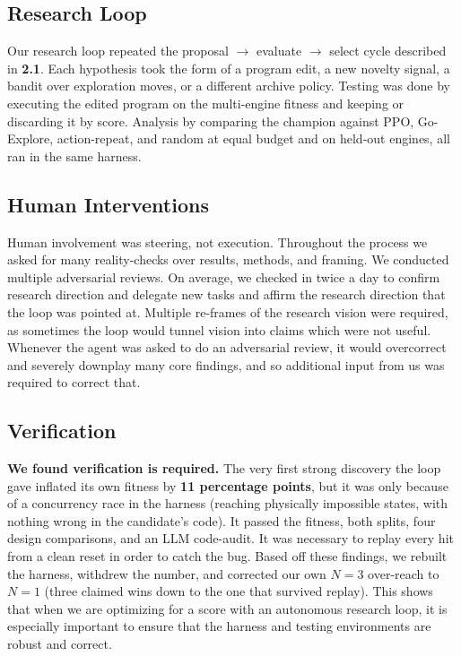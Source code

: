 \documentclass{article}
\begin{document}
\subsection{Research Loop}
\label{sec:loop}
Our research loop repeated the proposal $\rightarrow$ evaluate $\rightarrow$ select cycle described in \textbf{2.1}. Each hypothesis took the form of a
program edit, a new novelty signal, a bandit over exploration moves, or a different archive policy. Testing was done by executing the edited program on the multi-engine fitness and keeping or discarding it by score.
Analysis by comparing the champion against PPO, Go-Explore, action-repeat, and random at equal budget and on held-out
engines, all ran in the same harness.

\subsection{Human Interventions}
\label{sec:human}
Human involvement was steering, not execution. Throughout the process we asked for many reality-checks over results, methods, and framing. We conducted multiple adversarial reviews. On average, we checked in twice a day to confirm research direction and delegate new
tasks and affirm the research direction that the loop was pointed at. Multiple re-frames of the research vision were required, as sometimes the loop would tunnel
vision into claims which were not useful. Whenever the agent was asked to do an adversarial review, it would overcorrect
and severely downplay many core findings, and so additional input from us was required to correct that.

\subsection{Verification}
\label{sec:verify}
\textbf{We found verification is required.} The very first strong discovery the loop gave inflated its own fitness by \textbf{11 percentage points}, but it was only because of a concurrency race in the harness (reaching physically impossible states, with nothing wrong in the candidate's
code). It passed the fitness, both splits, four design comparisons, and an LLM code-audit. It was necessary to replay every hit from a clean reset in order to catch the bug. Based off these findings, we rebuilt the harness, withdrew the number, and corrected our own
$N{=}3$ over-reach to $N{=}1$ (three claimed wins down to the one that survived replay). This shows that when we are
optimizing for a score with an autonomous research loop, it is especially important to ensure that the harness and testing
environments are robust and correct.
\end{document}

